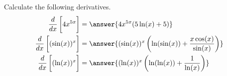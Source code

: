 \documentclass{ximera}
\author{Nela Lakos \and Kyle Parsons}
\begin{document}
\begin{exercise}

Calculate the following derivatives.
\begin{align*}
\frac{d}{dx}\left[\vphantom{\frac{d}{dx}}4x^{5x}\right] &= \answer{4x^{5x}(5\ln(x)+5)}\\
\frac{d}{dx}\left[\vphantom{\frac{d}{dx}}(\sin(x))^x\right] &= \answer{(\sin(x))^x\left(\ln(\sin(x)) + \frac{x\cos(x)}{\sin(x)}\right)}\\
\frac{d}{dx}\left[\vphantom{\frac{d}{dx}}(\ln(x))^x\right] &= \answer{(\ln(x))^x\left(\ln(\ln(x)) + \frac{1}{\ln(x)}\right)}
\end{align*}

\end{exercise}
\end{document}
